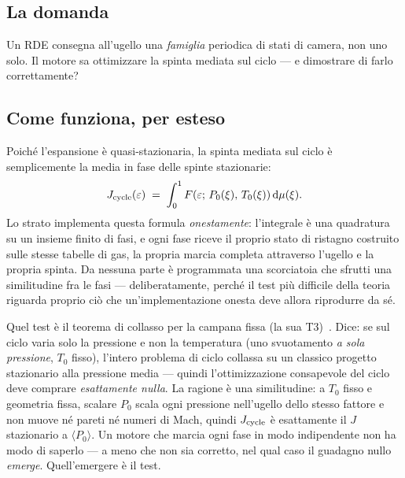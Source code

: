 \subsection{La domanda}

Un RDE consegna all'ugello una \emph{famiglia} periodica di stati di
camera, non uno solo. Il motore sa ottimizzare la spinta mediata sul
ciclo --- e dimostrare di farlo correttamente?

\subsection{Come funziona, per esteso}

Poiché l'espansione è quasi-stazionaria, la spinta mediata sul ciclo
è semplicemente la media in fase delle spinte stazionarie:
\begin{equation}
J_{\rm cycle}(\varepsilon) \;=\; \int_0^1
F\!\left(\varepsilon;\, P_0(\xi),\, T_0(\xi)\right)\mathrm{d}\mu(\xi).
\label{eq:jcycle}
\end{equation}
Lo strato implementa questa formula \emph{onestamente}: l'integrale è
una quadratura su un insieme finito di fasi, e ogni fase riceve il
proprio stato di ristagno costruito sulle stesse tabelle di gas, la
propria marcia completa attraverso l'ugello e la propria spinta. Da
nessuna parte è programmata una scorciatoia che sfrutti una
similitudine fra le fasi --- deliberatamente, perché il test più
difficile della teoria riguarda proprio ciò che
un'implementazione onesta deve allora riprodurre da sé.

Quel test è il teorema di collasso per la campana fissa (la sua
T3)~\cite{theory}. Dice: se sul ciclo varia solo la pressione e non
la temperatura (uno svuotamento \emph{a sola pressione}, $T_0$
fisso), l'intero problema di ciclo collassa su un classico progetto
stazionario alla pressione media --- quindi l'ottimizzazione
consapevole del ciclo deve comprare \emph{esattamente nulla}. La
ragione è una similitudine: a $T_0$ fisso e geometria fissa, scalare
$P_0$ scala ogni pressione nell'ugello dello stesso fattore e non
muove né pareti né numeri di Mach, quindi $J_{\rm cycle}$ è
esattamente il $J$ stazionario a $\langle P_0\rangle$. Un motore che
marcia ogni fase in modo indipendente non ha modo di saperlo --- a
meno che non sia corretto, nel qual caso il guadagno nullo
\emph{emerge}. Quell'emergere è il test.

